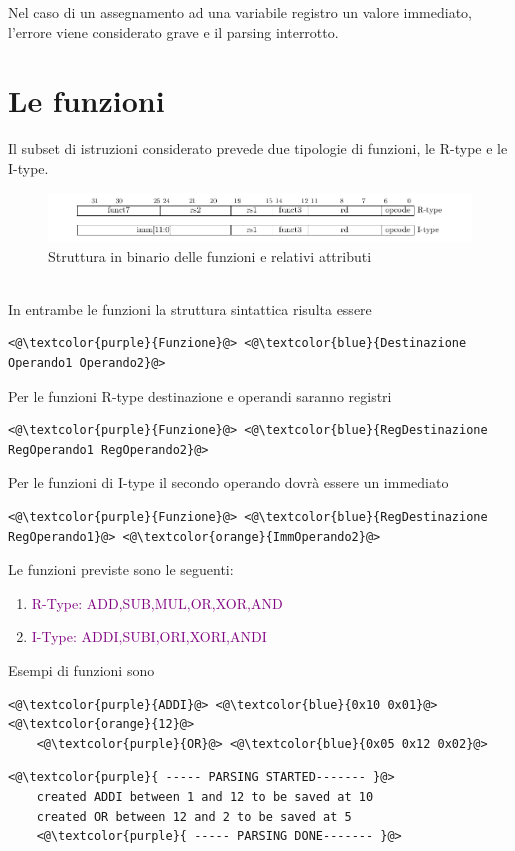 Nel caso di un assegnamento ad una variabile registro un valore immediato, l'errore viene considerato grave e il parsing interrotto.



\newpage
\section{Le funzioni}
Il subset di istruzioni considerato prevede due tipologie di funzioni, le R-type e le I-type.
\begin{figure}[h]
    \centering
    \includegraphics[scale=0.5]{functionTypes.png}
    \caption{Struttura in binario delle funzioni e relativi attributi}
    \label{fig:err1}
\end{figure}
\\
In entrambe le funzioni la struttura sintattica risulta essere
\begin{lstlisting}[numbers=none]
    <@\textcolor{purple}{Funzione}@> <@\textcolor{blue}{Destinazione Operando1 Operando2}@>
\end{lstlisting}
Per le funzioni R-type destinazione e operandi saranno registri
\begin{lstlisting}[numbers=none]
    <@\textcolor{purple}{Funzione}@> <@\textcolor{blue}{RegDestinazione RegOperando1 RegOperando2}@>
\end{lstlisting}
Per le funzioni di I-type il secondo operando dovrà essere un immediato
\begin{lstlisting}[numbers=none]
    <@\textcolor{purple}{Funzione}@> <@\textcolor{blue}{RegDestinazione RegOperando1}@> <@\textcolor{orange}{ImmOperando2}@>
\end{lstlisting}

Le funzioni previste sono le seguenti: 
\begin{enumerate}
    \item \textcolor{purple}{R-Type: ADD,SUB,MUL,OR,XOR,AND}
    \item \textcolor{purple}{I-Type: ADDI,SUBI,ORI,XORI,ANDI}
\end{enumerate}
Esempi di funzioni sono 
\begin{lstlisting}[caption=input]
    <@\textcolor{purple}{ADDI}@> <@\textcolor{blue}{0x10 0x01}@> <@\textcolor{orange}{12}@>
    <@\textcolor{purple}{OR}@> <@\textcolor{blue}{0x05 0x12 0x02}@>
\end{lstlisting}
\begin{lstlisting}[caption=output]
    <@\textcolor{purple}{ ----- PARSING STARTED------- }@>
    created ADDI between 1 and 12 to be saved at 10
    created OR between 12 and 2 to be saved at 5
    <@\textcolor{purple}{ ----- PARSING DONE------- }@>
\end{lstlisting}
